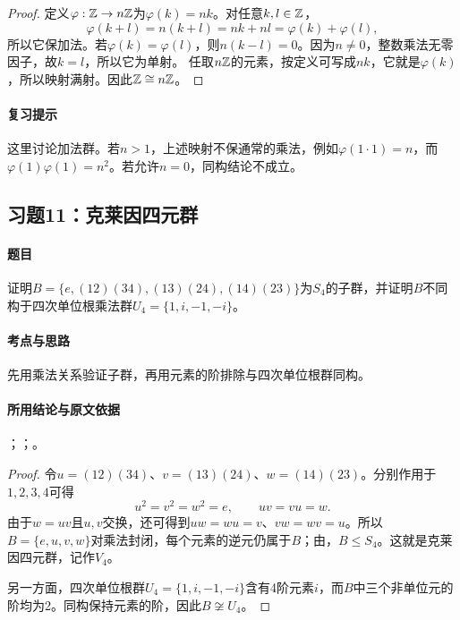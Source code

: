 
\begin{proof}
定义$\varphi:\mathbb Z\to n\mathbb Z$为$\varphi(k)=nk$。对任意$k,l\in\mathbb Z$，
\[
\varphi(k+l)=n(k+l)=nk+nl=\varphi(k)+\varphi(l),
\]
所以它保加法。若$\varphi(k)=\varphi(l)$，则$n(k-l)=0$。因为$n\ne0$，整数乘法无零因子，故$k=l$，所以它为单射。
任取$n\mathbb Z$的元素，按定义可写成$nk$，它就是$\varphi(k)$，所以映射满射。因此$\mathbb Z\cong n\mathbb Z$。
\end{proof}

\paragraph{复习提示}
这里讨论加法群。若$n>1$，上述映射不保通常的乘法，例如$\varphi(1\cdot1)=n$，而$\varphi(1)\varphi(1)=n^2$。若允许$n=0$，同构结论不成立。


\subsection{习题11：\texorpdfstring{克莱因四元群}{克莱因四元群}}
\label{ex:1:11}

\paragraph{题目}
证明$B=\{e,(12)(34),(13)(24),(14)(23)\}$为$S_4$的子群，并证明$B$不同构于四次单位根乘法群$U_4=\{1,i,-1,-i\}$。

\paragraph{考点与思路}
先用乘法关系验证子群，再用元素的阶排除与四次单位根群同构。

\paragraph{所用结论与原文依据}
；；。


\begin{proof}
令$u=(12)(34)$、$v=(13)(24)$、$w=(14)(23)$。分别作用于$1,2,3,4$可得
\[
u^2=v^2=w^2=e,\qquad uv=vu=w.
\]
由于$w=uv$且$u,v$交换，还可得到$uw=wu=v$、$vw=wv=u$。所以$B=\{e,u,v,w\}$对乘法封闭，每个元素的逆元仍属于$B$；由，$B\leq S_4$。这就是克莱因四元群，记作$V_4$。

另一方面，四次单位根群$U_4=\{1,i,-1,-i\}$含有4阶元素$i$，而$B$中三个非单位元的阶均为2。同构保持元素的阶，因此$B\not\cong U_4$。
\end{proof}

